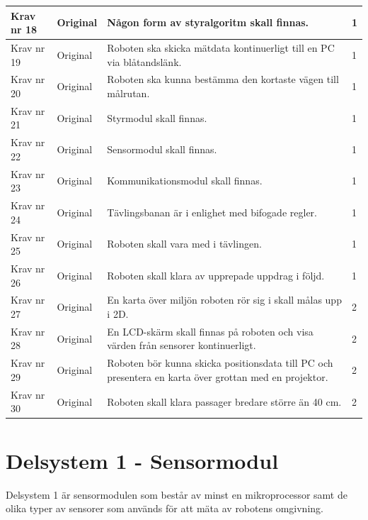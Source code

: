 \documentclass[11pt]{article}
\begin{document}
\begin{flushleft}
\begin{center}
\begin{longtable}{|l|l|p{.70\linewidth}|l|}
Krav nr 18 &
Original &
Någon form av styralgoritm skall finnas. &
1 \\ \hline

Krav nr 19 &
Original &
Roboten ska skicka mätdata kontinuerligt till en PC via blåtandslänk. &
1 \\ \hline

Krav nr 20 &
Original &
Roboten ska kunna bestämma den kortaste vägen till målrutan. &
1 \\ \hline

Krav nr 21 &
Original &
Styrmodul skall finnas. &
1 \\ \hline

Krav nr 22 &
Original &
Sensormodul skall finnas. &
1 \\ \hline

Krav nr 23 &
Original &
Kommunikationsmodul skall finnas. &
1 \\ \hline

Krav nr 24 &
Original &
Tävlingsbanan är i enlighet med bifogade regler. &
1 \\ \hline

Krav nr 25 &
Original &
Roboten skall vara med i tävlingen. &
1 \\ \hline

Krav nr 26 &
Original &
Roboten skall klara av upprepade uppdrag i följd. &
1 \\ \hline

Krav nr 27 &
Original &
En karta över miljön roboten rör sig i skall målas upp i 2D. &
2 \\ \hline

Krav nr 28 &
Original &
En LCD-skärm skall finnas på roboten och visa värden från sensorer kontinuerligt. &
2 \\ \hline

Krav nr 29 &
Original &
Roboten bör kunna skicka positionsdata till PC och presentera en karta över grottan med en projektor. &
2 \\ \hline

Krav nr 30 &
Original &
Roboten skall klara passager bredare större än 40 cm. &
2 \\ \hline

\end{longtable}
\end{center}




\pagebreak

\section{Delsystem 1 - Sensormodul}
Delsystem 1 är sensormodulen som består av minst en mikroprocessor samt de olika typer av sensorer som används för att mäta av robotens omgivning.


\end{flushleft}
\end{document}
